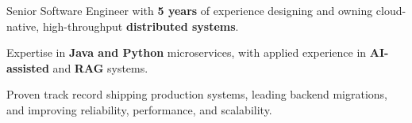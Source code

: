 \begin{zitemize}
    \item Senior Software Engineer with \textbf{5 years} of experience designing and owning cloud-native, high-throughput \textbf{distributed systems}.
    \item Expertise in \textbf{Java and Python} microservices, with applied experience in \textbf{AI-assisted} and \textbf{RAG} systems.
    \item Proven track record shipping production systems, leading backend migrations, and improving reliability, performance, and scalability.
\end{zitemize}
